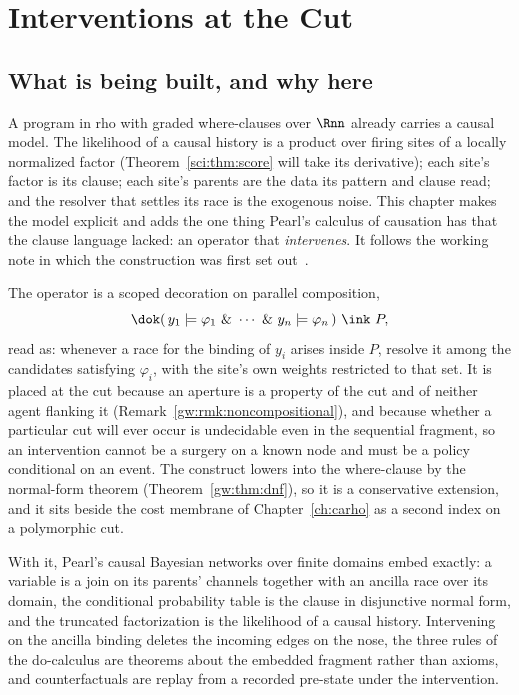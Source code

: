 \chapter{Interventions at the Cut}
\label{ch:do}

\section{What is being built, and why here}

A program in rho with graded where-clauses over $\Rnn$ already carries a causal model. The
likelihood of a causal history is a product over firing sites of a locally normalized factor
(Theorem~\ref{sci:thm:score} will take its derivative); each site's factor is its clause; each
site's parents are the data its pattern and clause read; and the resolver that settles its race
is the exogenous noise. This chapter makes the model explicit and adds the one thing Pearl's
calculus of causation has that the clause language lacked: an operator that \emph{intervenes}.
It follows the working note in which the construction was first set out~\cite{Interventions}.

The operator is a scoped decoration on parallel composition,
\[
  \dok(\,y_1 \models \varphi_1 \ \&\ \cdots\ \&\ y_n \models \varphi_n\,)\ \ink\ P ,
\]
read as: whenever a race for the binding of $y_i$ arises inside $P$, resolve it among the
candidates satisfying $\varphi_i$, with the site's own weights restricted to that set. It is placed
at the cut because an aperture is a property of the cut and of neither agent flanking it
(Remark~\ref{gw:rmk:noncompositional}), and because whether a particular cut will ever occur is
undecidable even in the sequential fragment, so an intervention cannot be a surgery on a known node
and must be a policy conditional on an event. The construct lowers into the where-clause by the
normal-form theorem (Theorem~\ref{gw:thm:dnf}), so it is a conservative extension, and it sits
beside the cost membrane of Chapter~\ref{ch:carho} as a second index on a polymorphic cut.

With it, Pearl's causal Bayesian networks over finite domains embed exactly: a variable is a join on
its parents' channels together with an ancilla race over its domain, the conditional probability
table is the clause in disjunctive normal form, and the truncated factorization is the likelihood
of a causal history. Intervening on the ancilla binding deletes the incoming edges on the nose, the
three rules of the do-calculus are theorems about the embedded fragment rather than axioms, and
counterfactuals are replay from a recorded pre-state under the intervention.

